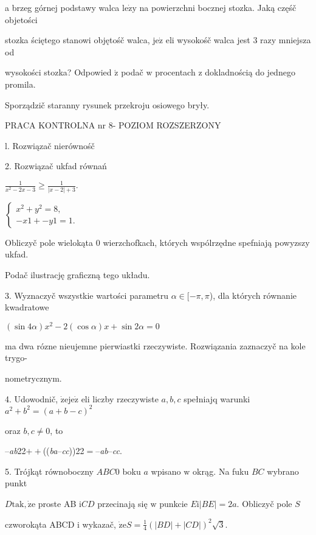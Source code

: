 \documentclass[a4paper,12pt]{article}
\begin{document}
a brzeg górnej podstawy walca $\mathrm{l}\mathrm{e}\dot{\mathrm{z}}\mathrm{y}$ na powierzchni bocznej stozka. Jaką częśč objetości

stozka ściętego stanowi objętośč walca, $\mathrm{j}\mathrm{e}\dot{\mathrm{z}}$ eli wysokośč walca jest 3 razy mniejsza od

wysokości stozka? Odpowied $\acute{\mathrm{z}}$ podač $\mathrm{w}$ procentach $\mathrm{z}$ dokladnością do jednego promila.

Sporządzič staranny rysunek przekroju osiowego bryły.





PRACA KONTROLNA nr 8- POZIOM ROZSZERZONY

l. Rozwiązač nierównośč

2. Rozwiązač ukfad równań

$\displaystyle \frac{1}{x^{2}-2x-3}\geq\frac{1}{|x-2|+3}.$

$\left\{\begin{array}{l}
x^{2}+y^{2}=8,\\
- x1+-y1=1.
\end{array}\right.$

Obliczyč pole wielokąta $0$ wierzchofkach, których wspólrzędne spefniają powyzszy ukfad.

Podač ilustrację graficzną tego układu.

3. Wyznaczyč wszystkie wartości parametru $\alpha\in[-\pi,\pi$), dla których równanie kwadratowe

$(\sin 4\alpha)x^{2}-2(\cos\alpha)x+\sin 2\alpha=0$

ma dwa rózne nieujemne pierwiastki rzeczywiste. Rozwiązania zaznaczyč na kole trygo-

nometrycznym.

4. Udowodnič, $\dot{\mathrm{z}}\mathrm{e}\mathrm{j}\mathrm{e}\dot{\mathrm{z}}$ eli liczby rzeczywiste $a, b, c$ spełniajq warunki $a^{2}+b^{2}= (a+b-c)^{2}$

oraz $b, c\neq 0$, to

--{\it ab}22$++$(({\it ba}--{\it cc}))22$=$--{\it ab}--{\it cc}.

5. Trójkąt równoboczny $ABC0$ boku $a$ wpisano $\mathrm{w}$ okrąg. Na fuku $BC$ wybrano punkt

$D\mathrm{t}\mathrm{a}\mathrm{k}, \dot{\mathrm{z}}\mathrm{e}$ proste AB $\mathrm{i}CD$ przecinają się $\mathrm{w}$ punkcie $E\mathrm{i} |BE| = 2a$. Obliczyč pole $S$

czworokąta ABCD $\mathrm{i}$ wykazač, $\displaystyle \dot{\mathrm{z}}\mathrm{e}S=\frac{1}{4}(|BD|+|CD|)^{2}\sqrt{3}.$
\end{document}
